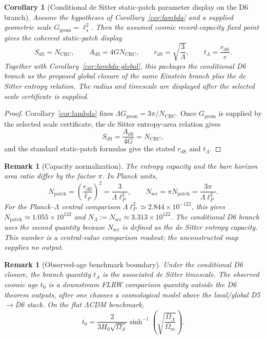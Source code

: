 \documentclass[11pt]{article}
\newtheorem{corollary}[theorem]{Corollary}
\newtheorem{remark}[theorem]{Remark}
\begin{document}
\begin{corollary}[Conditional de Sitter static-patch parameter display on the D6 branch]\label{cor:lambda-parameters}
Assume the hypotheses of Corollary~\ref{cor:lambda} and a supplied geometric scale
\(G_{\mathrm{geom}}=\ell_\star^2\). Then the assumed cosmic record-capacity fixed point gives the
coherent static-patch display
\[
S_{\mathrm{dS}}=N_{\mathrm{CRC}},
\qquad
A_{\mathrm{dS}}=4G N_{\mathrm{CRC}},
\qquad
r_{\mathrm{dS}}=\sqrt{\frac{3}{\Lambda}},
\qquad
t_\Lambda=\frac{r_{\mathrm{dS}}}{c}.
\]
Together with Corollary~\ref{cor:lambda-global}, this packages the conditional D6 branch as the proposed global closure
of the same Einstein branch plus the de Sitter entropy relation. The radius and timescale are
displayed after the selected scale certificate is supplied.
\end{corollary}

\begin{proof}
Corollary~\ref{cor:lambda} fixes \(\Lambda G_{\mathrm{geom}}=3\pi/N_{\mathrm{CRC}}\). Once
\(G_{\mathrm{geom}}\) is supplied by the selected scale certificate, the de Sitter entropy-area relation gives
\[
S_{\mathrm{dS}}=\frac{A_{\mathrm{dS}}}{4G}=N_{\mathrm{CRC}},
\]
and the standard static-patch formulas give the stated \(r_{\mathrm{dS}}\) and \(t_\Lambda\).
\end{proof}

\begin{remark}[Capacity normalization]\label{rem:lambda-capacity-normalization}
The entropy capacity and the bare horizon area ratio differ by the factor \(\pi\). In Planck units,
\[
N_{\mathrm{patch}}=\left(\frac{r_{\mathrm{dS}}}{\ell_P}\right)^2
=\frac{3}{\Lambda\ell_P^2},
\qquad
N_{\mathrm{scr}}=\pi N_{\mathrm{patch}}
=\frac{3\pi}{\Lambda\ell_P^2}.
\]
For the Planck--\(\Lambda\) central comparison \(\Lambda\ell_P^2\simeq2.844\times10^{-122}\), this gives
\(N_{\mathrm{patch}}\simeq1.055\times10^{122}\) and
\(N_{\Lambda}:=N_{\mathrm{scr}}\simeq3.313\times10^{122}\). The conditional D6 branch uses the
second quantity because \(N_{\mathrm{scr}}\) is defined as the de Sitter entropy capacity. This
number is a central-value comparison readout; the unconstructed map supplies no output.
\end{remark}



\begin{remark}[Observed-age benchmark boundary]\label{rem:lambda-age}
Under the conditional D6 closure, the branch quantity \(t_\Lambda\) is the associated de Sitter
timescale. The observed cosmic age \(t_0\) is a downstream FLRW comparison quantity outside the D6
theorem outputs, after one chooses a cosmological model above the local/global D5\(\to\)D6 stack. On
the flat \(\Lambda\)CDM benchmark,
\[
t_0=\frac{2}{3H_0\sqrt{\Omega_\Lambda}}
\sinh^{-1}\!\left(\sqrt{\frac{\Omega_\Lambda}{\Omega_m}}\right).
\]
\end{remark}
\end{document}
